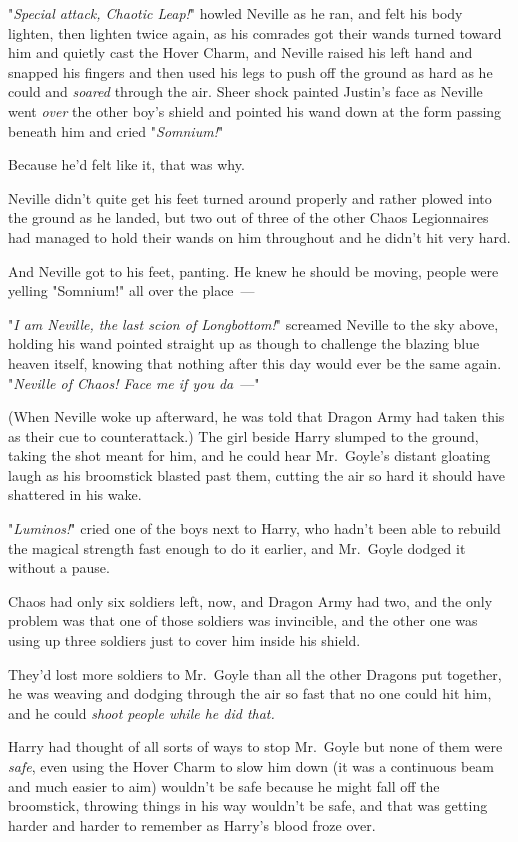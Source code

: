 "\emph{Special attack, Chaotic Leap!}" howled Neville as he ran, and felt his
body lighten, then lighten twice again, as his comrades got their wands turned
toward him and quietly cast the Hover Charm, and Neville raised his left hand
and snapped his fingers and then used his legs to push off the ground as hard
as he could and \emph{soared} through the air. Sheer shock painted Justin's
face as Neville went \emph{over} the other boy's shield and pointed his wand
down at the form passing beneath him and cried "\emph{Somnium!}"

Because he'd felt like it, that was why.

Neville didn't quite get his feet turned around properly and rather plowed into
the ground as he landed, but two out of three of the other Chaos Legionnaires
had managed to hold their wands on him throughout and he didn't hit very hard.

And Neville got to his feet, panting. He knew he should be moving, people were
yelling "Somnium!" all over the place~---

"\emph{I am Neville, the last scion of Longbottom!}" screamed Neville to the
sky above, holding his wand pointed straight up as though to challenge the
blazing blue heaven itself, knowing that nothing after this day would ever be
the same again. "\emph{Neville of Chaos! Face me if you da}~---"

(When Neville woke up afterward, he was told that Dragon Army had taken this as
their cue to counterattack.)
\sbreak
The girl beside Harry slumped to the ground, taking the shot meant for him, and
he could hear Mr.~Goyle's distant gloating laugh as his broomstick blasted past
them, cutting the air so hard it should have shattered in his wake.

"\emph{Luminos!}" cried one of the boys next to Harry, who hadn't been able to
rebuild the magical strength fast enough to do it earlier, and Mr.~Goyle dodged
it without a pause.

Chaos had only six soldiers left, now, and Dragon Army had two, and the only
problem was that one of those soldiers was invincible, and the other one was
using up three soldiers just to cover him inside his shield.

They'd lost more soldiers to Mr.~Goyle than all the other Dragons put together,
he was weaving and dodging through the air so fast that no one could hit him,
and he could \emph{shoot people while he did that.}

Harry had thought of all sorts of ways to stop Mr.~Goyle but none of them were
\emph{safe}, even using the Hover Charm to slow him down (it was a continuous
beam and much easier to aim) wouldn't be safe because he might fall off the
broomstick, throwing things in his way wouldn't be safe, and that was getting
harder and harder to remember as Harry's blood froze over.

